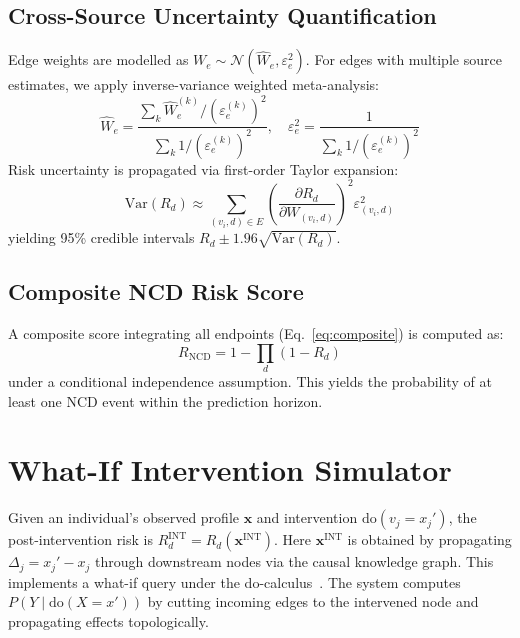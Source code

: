 \documentclass[runningheads]{llncs}
\begin{document}
\subsection{Cross-Source Uncertainty Quantification}\label{sec:uncert}

Edge weights are modelled as $W_e \sim \mathcal{N}(\hat{W}_e,
\varepsilon_e^2)$.
For edges with multiple source estimates, we apply inverse-variance
weighted meta-analysis:
\begin{equation}\label{eq:meta}
\hat{W}_e = \frac{\sum_k \hat{W}_e^{(k)} / (\varepsilon_e^{(k)})^2}
{\sum_k 1 / (\varepsilon_e^{(k)})^2}, \quad
\varepsilon_e^2 = \frac{1}{\sum_k 1 / (\varepsilon_e^{(k)})^2}
\end{equation}
Risk uncertainty is propagated via first-order Taylor expansion:
\begin{equation}\label{eq:riskvar}
\mathrm{Var}(R_d) \approx \sum_{(v_i,d) \in E}
\left(\frac{\partial R_d}{\partial W_{(v_i,d)}}\right)^2 \varepsilon_{(v_i,d)}^2
\end{equation}
yielding 95\% credible intervals $R_d \pm 1.96\sqrt{\mathrm{Var}(R_d)}$.

\subsection{Composite NCD Risk Score}\label{sec:composite}

A composite score integrating all endpoints (Eq.~\ref{eq:composite})
is computed as:
\begin{equation}\label{eq:composite}
R_{\mathrm{NCD}} = 1 - \prod_{d} (1 - R_d)
\end{equation}
under a conditional independence assumption.
This yields the probability of at least one NCD event within the
prediction horizon.

\section{What-If Intervention Simulator}\label{sec:whatif}

Given an individual's observed profile $\mathbf{x}$ and intervention
$\mathrm{do}(v_j = x_j')$, the post-intervention risk is
$R_d^{\mathrm{INT}} = R_d(\mathbf{x}^{\mathrm{INT}})$.
Here $\mathbf{x}^{\mathrm{INT}}$ is obtained by propagating
$\Delta_j = x_j' - x_j$ through downstream nodes via the causal
knowledge graph.
This implements a what-if query under the
do-calculus~\cite{pearl2009causality}.
The system computes $P(Y \mid \mathrm{do}(X = x'))$ by cutting
incoming edges to the intervened node and propagating effects
topologically.
\end{document}
